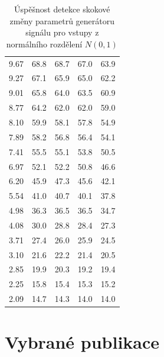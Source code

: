 \documentclass[11pt,twoside,openright]{report}
\begin{document}
\begin{appendices}
\begin{table}[!h]
\begin{center}
\begin{tabular}{|c|c|c|c|c|}
9.67 & 68.8 & 68.7 & 67.0 & 63.9 \\ 
9.27 & 67.1 & 65.9 & 65.0 & 62.2 \\ 
9.01 & 65.8 & 64.0 & 63.5 & 60.9 \\ 
8.77 & 64.2 & 62.0 & 62.0 & 59.0 \\ 
8.10 & 59.9 & 58.1 & 57.8 & 54.9 \\ 
7.89 & 58.2 & 56.8 & 56.4 & 54.1 \\ 
7.41 & 55.5 & 55.1 & 53.8 & 50.5 \\ 
6.97 & 52.1 & 52.2 & 50.8 & 46.6 \\ 
6.20 & 45.9 & 47.3 & 45.6 & 42.1 \\ 
5.54 & 41.0 & 40.7 & 40.1 & 37.8 \\ 
4.98 & 36.3 & 36.5 & 36.5 & 34.7 \\ 
4.08 & 30.0 & 28.8 & 28.4 & 27.3 \\ 
3.71 & 27.4 & 26.0 & 25.9 & 24.5 \\ 
3.10 & 21.6 & 22.2 & 21.4 & 20.5 \\ 
2.85 & 19.9 & 20.3 & 19.2 & 19.4 \\   
2.25 & 15.8 & 15.4 & 15.3 & 15.2 \\ 
2.09 & 14.7 & 14.3 & 14.0 & 14.0 \\ 
\hline
\end{tabular}
\caption{Úspěšnost detekce skokové změny parametrů generátoru signálu pro vstupy z normálního rozdělení $N(0,1)$}
\label{tab:normal}
\end{center}
\end{table}
\clearpage
\section{Vybrané publikace}





\end{appendices}
\end{document}
